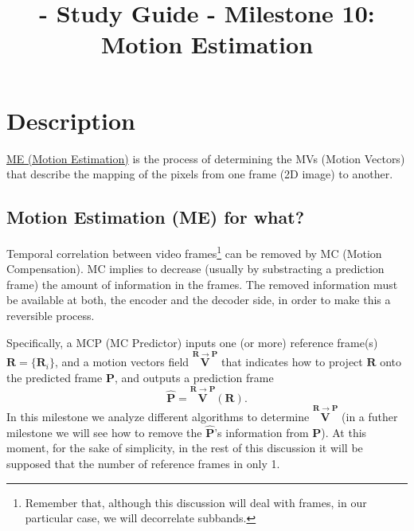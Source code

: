
\title{\SM{} - Study Guide - Milestone 10: Motion Estimation}

\maketitle

\tableofcontents

\section{Description}

\href{https://en.wikipedia.org/wiki/Motion_estimation}{ME (Motion
  Estimation)} is the process of determining the MVs (Motion Vectors)
that describe the mapping of the pixels from one frame (2D image) to
another.

\subsection{Motion Estimation (ME) for what?}
Temporal correlation between video frames\footnote{Remember that,
although this discussion will deal with frames, in our particular
case, we will decorrelate subbands.} can be removed by MC (Motion
Compensation). MC implies to decrease (usually by substracting a
prediction frame) the amount of information in the frames. The removed
information must be available at both, the encoder and the decoder
side, in order to make this a reversible process.

Specifically, a MCP (MC Predictor) inputs one (or more) reference
frame(s) ${\mathbf R}=\{{\mathbf R}_i\}$, and a motion vectors field
$\overset{{\mathbf R}\rightarrow{\mathbf P}}{\mathbf V}$ that
indicates how to project ${\mathbf R}$ onto the predicted frame ${\mathbf P}$, and outputs
a prediction frame
\begin{equation}
  \hat{{\mathbf P}} =  \overset{{\mathbf R}\rightarrow {\mathbf P}}{\mathbf V}({\mathbf R}).
  \label{eq:MCP1}
\end{equation}
In this milestone we analyze different algorithms to determine
$\overset{{\mathbf R}\rightarrow {\mathbf P}}{\mathbf V}$ (in a futher
milestone we will see how to remove the $\hat{{\mathbf P}}$'s
information from ${\mathbf P}$). At this moment, for the sake of
simplicity, in the rest of this discussion it will be supposed that the
number of reference frames in only 1.

